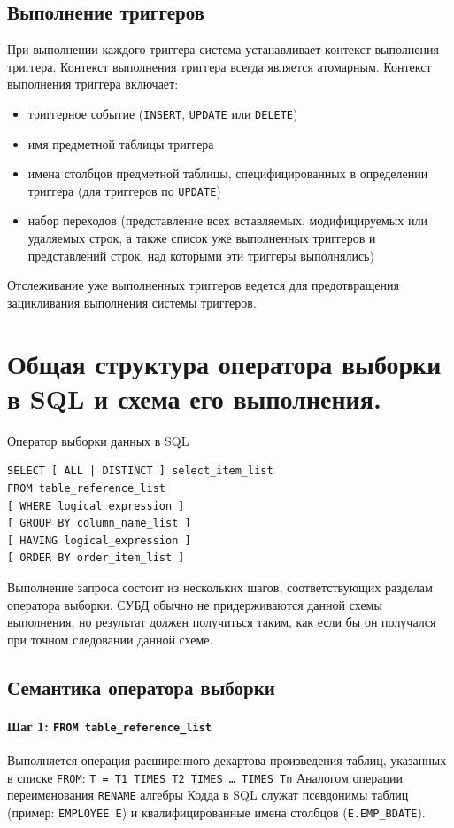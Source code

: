 \documentclass[a4paper,12pt]{article}
\begin{document}
\subsection{Выполнение триггеров}

При выполнении каждого триггера система устанавливает контекст выполнения триггера. Контекст выполнения триггера всегда является атомарным. Контекст выполнения триггера включает:
\begin{itemize}
    \item триггерное событие (\texttt{INSERT}, \texttt{UPDATE} или \texttt{DELETE})
    \item имя предметной таблицы триггера
    \item имена столбцов предметной таблицы, специфицированных в определении триггера (для триггеров по \texttt{UPDATE})
    \item набор переходов (представление всех вставляемых, модифицируемых или удаляемых строк, а также список уже выполненных триггеров и представлений строк, над которыми эти триггеры выполнялись)
\end{itemize}

Отслеживание уже выполненных триггеров ведется для предотвращения зацикливания выполнения системы триггеров.

\section{Общая структура оператора выборки в SQL и схема его выполнения.}

Оператор выборки данных в SQL  
\begin{lstlisting}
SELECT [ ALL | DISTINCT ] select_item_list
FROM table_reference_list
[ WHERE logical_expression ]
[ GROUP BY column_name_list ]
[ HAVING logical_expression ]
[ ORDER BY order_item_list ]
\end{lstlisting}

Выполнение запроса состоит из нескольких шагов, соответствующих разделам оператора выборки.  
СУБД обычно не придерживаются данной схемы выполнения, но результат должен получиться таким, как если бы он получался при точном следовании данной схеме.

\subsection{Семантика оператора выборки}

\paragraph{Шаг 1: \texttt{FROM table\_reference\_list}}  
Выполняется операция расширенного декартова произведения таблиц, указанных в списке \texttt{FROM}: \texttt{T = T1 TIMES T2 TIMES … TIMES Tn}  
Аналогом операции переименования \texttt{RENAME} алгебры Кодда в SQL служат псевдонимы таблиц (пример: \texttt{EMPLOYEE E}) и квалифицированные имена столбцов (\texttt{E.EMP\_BDATE}).
\end{document}
